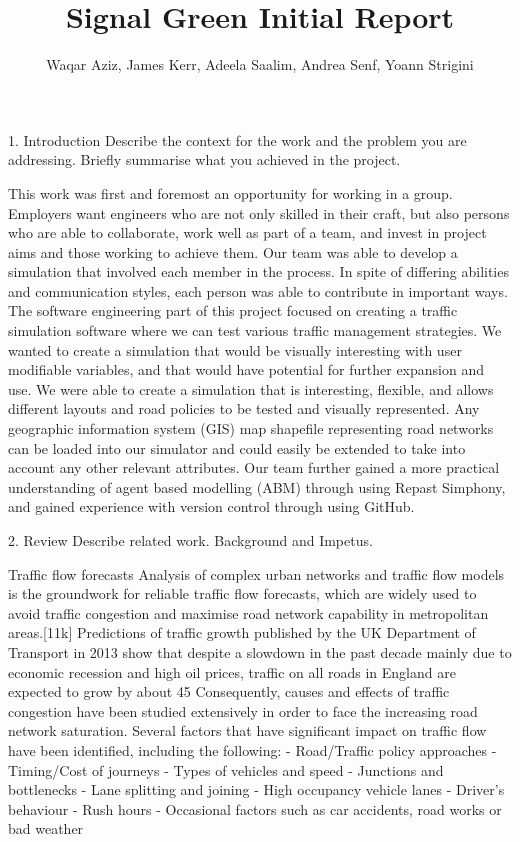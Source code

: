 \documentclass[11pt]{article}
\begin{document}
\title{Signal Green Initial Report}

\author{Waqar Aziz, James Kerr, Adeela Saalim, Andrea Senf, Yoann Strigini}

\maketitle 
\section*{}




1. Introduction Describe the context for the work and the problem you are addressing. Briefly summarise what you achieved in the project.

This work was first and foremost an opportunity for working in a group. Employers want engineers who are not only skilled in their craft, but also persons who are able to collaborate, work well as part of a team, and invest in project aims and those working to achieve them. Our team was able to develop a simulation that involved each member in the process. In spite of differing abilities and communication styles, each person was able to contribute in important ways.
The software engineering part of this project focused on creating a traffic simulation software where we can test various traffic management strategies. We wanted to create a simulation that would be visually interesting with user modifiable variables, and that would have potential for further expansion and use.
We were able to create a simulation that is interesting, flexible, and allows different layouts and road policies to be tested and visually represented. Any geographic information system (GIS) map shapefile representing road networks can be loaded into our simulator and could easily be extended to take into account any other relevant attributes.
Our team further gained a more practical understanding of agent based modelling (ABM) through using Repast Simphony, and gained experience with version control through using GitHub.


2. Review Describe related work. Background and Impetus. 

Traffic flow forecasts 
Analysis of complex urban networks and traffic flow models is the groundwork for reliable traffic flow forecasts, which are widely used to avoid traffic congestion and maximise road network capability in metropolitan areas.[11k]  Predictions of traffic growth published by the UK Department of Transport in 2013 show that despite a slowdown in the  past decade mainly due to economic recession and high oil prices, traffic on all roads in England are expected to grow by about 45%
Consequently, causes and effects of traffic congestion have been studied extensively in order to face the increasing road network saturation. Several factors that have significant impact on traffic flow have been identified, including the following: 
-	Road/Traffic policy approaches
-	Timing/Cost of journeys
-	Types of vehicles and speed
-	Junctions and bottlenecks
-	Lane splitting and joining
-	High occupancy vehicle lanes
-	Driver’s behaviour
-	Rush hours
-	Occasional factors such as car accidents, road works or bad weather
\end{document}
